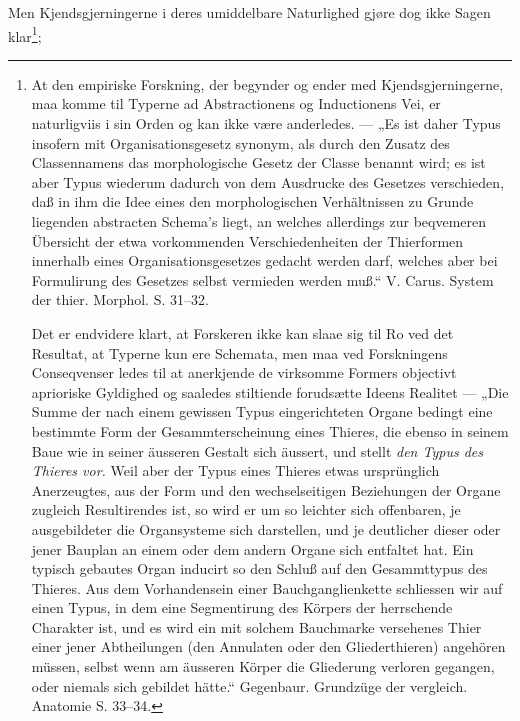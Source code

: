 \documentclass[12pt,a4paper]{book}
\begin{document}
\setcounter{footnote}{0}
Men Kjendsgjerningerne i deres umiddelbare Naturlighed gjøre dog ikke Sagen
klar\footnote{At den empiriske Forskning, der begynder og ender med
Kjendsgjerningerne, maa komme til Typerne ad Abstractionens og Inductionens
Vei, er naturligviis i sin Orden og kan ikke være anderledes. --- „Es ist daher
Typus insofern mit Organisationsgesetz synonym, als durch den Zusatz des
Classennamens das morphologische Gesetz der Classe benannt wird; es ist aber
Typus wiederum dadurch von dem Ausdrucke des Gesetzes verschieden, daß in ihm
die Idee eines den morphologischen Verhältnissen zu Grunde liegenden abstracten
Schema's liegt, an welches allerdings zur beqvemeren Übersicht der etwa
vorkommenden Verschiedenheiten der Thierformen innerhalb eines
Organisationsgesetzes gedacht werden darf, welches aber bei Formulirung des
Gesetzes selbst vermieden werden muß.“ V. Carus. System der thier. Morphol.
S. 31--32.
\par Det er endvidere klart, at Forskeren ikke kan slaae sig til Ro ved det
Resultat, at Typerne kun ere Schemata, men maa ved Forskningens Conseqvenser
ledes til at anerkjende de virksomme Formers objectivt aprioriske Gyldighed og
saaledes stiltiende forudsætte Ideens Realitet --- „Die Summe der nach einem
gewissen Typus eingerichteten Organe bedingt eine bestimmte Form der
Gesammterscheinung eines Thieres, die ebenso in seinem Baue wie in seiner
äusseren Gestalt sich äussert, und stellt \emph{den Typus des Thieres vor.}
Weil aber der Typus eines Thieres etwas ursprünglich Anerzeugtes, aus der Form
und den wechselseitigen Beziehungen der Organe zugleich Resultirendes ist, so
wird er um so leichter sich offenbaren, je ausgebildeter die Organsysteme sich
darstellen, und je deutlicher dieser oder jener Bauplan an einem oder dem
andern Organe sich entfaltet hat. Ein typisch gebautes Organ inducirt so den
Schluß auf den Gesammttypus des Thieres. Aus dem Vorhandensein einer
Bauchganglienkette schliessen wir auf einen Typus, in dem eine Segmentirung des
Körpers der herrschende Charakter ist, und es wird ein mit solchem Bauchmarke
versehenes Thier einer jener Abtheilungen (den Annulaten oder den
Gliederthieren) angehören müssen, selbst wenn am äusseren Körper die Gliederung
verloren gegangen, oder niemals sich gebildet hätte.“ Gegenbaur. Grundzüge der
vergleich. Anatomie S. 33--34.};
\end{document}
